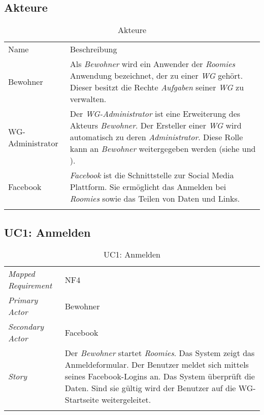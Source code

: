 \subsection{Akteure}
\begin{table}[H]
	\tablestyle
	\tablealtcolored
	\begin{tabularx}{\textwidth}{lX}
		\tableheadcolor
		\tablehead Name &
		\tablehead Beschreibung \tabularnewline
		\tablebody
			Bewohner &
			Als \emph{Bewohner} wird ein Anwender der \emph{Roomies} Anwendung bezeichnet, der zu einer \emph{WG} gehört. \newline
			Dieser besitzt die Rechte \emph{Aufgaben} seiner \emph{WG} zu verwalten.
			\tabularnewline
			WG-Administrator &
			Der \emph{WG-Administrator} ist eine Erweiterung des Akteurs \emph{Bewohner}. Der Ersteller einer \emph{WG} wird automatisch zu deren \emph{Administrator}. Diese Rolle kann an \emph{Bewohner} weitergegeben werden (siehe \nameref{subsec:uc4} und \nameref{subsec:uc10}).
			\tabularnewline
			Facebook &
			\emph{Facebook} ist die Schnittstelle zur Social Media Plattform. Sie ermöglicht das Anmelden bei \emph{Roomies} sowie das Teilen von Daten und Links.
			\tabularnewline
		\tableend
	\end{tabularx}
	\caption{Akteure}
\end{table}

\subsection{UC1: Anmelden}\label{subsec:uc1}
\begin{table}[H]
	\tablestyle
	\tablealtcolored
	\begin{tabularx}{\textwidth}{lX}
		\tablebody
			\textit{Mapped Requirement} &
			NF4
			\tabularnewline
			\textit{Primary Actor} &
			Bewohner
			\tabularnewline
			\textit{Secondary Actor} &
			Facebook
			\tabularnewline
			\textit{Story} &
			Der \emph{Bewohner} startet \emph{Roomies}. Das System zeigt das Anmeldeformular. Der Benutzer meldet sich mittels seines Facebook-Logins an. Das System überprüft die Daten. Sind sie gültig wird der Benutzer auf die WG-Startseite weitergeleitet.
			\tabularnewline
		\tableend
	\end{tabularx}
	\caption{UC1: Anmelden}
\end{table}


